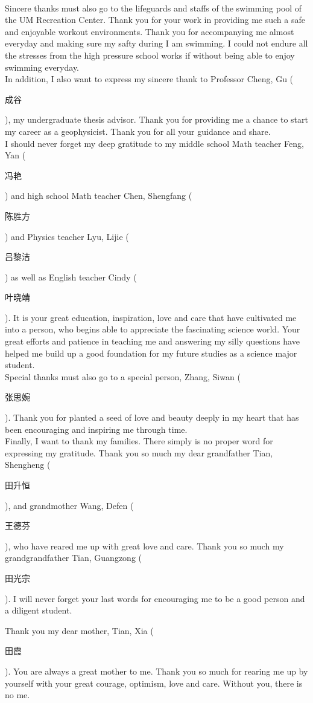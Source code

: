 \\
Sincere thanks must also go to the lifeguards and staffs of the swimming pool of the UM Recreation Center. Thank you for your work in providing me such a safe and enjoyable workout environments. Thank you for accompanying me almost everyday and making sure my safty during I am swimming. I could not endure all the stresses from the high pressure school works if without being able to enjoy swimming everyday.  
\\
In addition, I also want to express my sincere thank to Professor Cheng, Gu (\begin{CJK}{UTF8}{gbsn}成谷\end{CJK}), my undergraduate thesis advisor. Thank you for providing me a chance to start my career as a geophysicist. Thank you for all your guidance and share. 
\\
I should never forget my deep gratitude to my middle school Math teacher Feng, Yan (\begin{CJK}{UTF8}{gbsn}冯艳\end{CJK}) and high school Math teacher Chen, Shengfang (\begin{CJK}{UTF8}{gbsn}陈胜方\end{CJK}) and Physics teacher Lyu, Lijie (\begin{CJK}{UTF8}{gbsn}吕黎洁\end{CJK}) as well as English teacher Cindy (\begin{CJK}{UTF8}{gbsn}叶晓靖\end{CJK}). It is your great education, inspiration, love and care that have cultivated me into a person, who begins able to appreciate the fascinating science world. Your great efforts and patience in teaching me and answering my silly questions have helped me build up a good foundation for my future studies as a science major student.
\\
Special thanks must also go to a special person, Zhang, Siwan (\begin{CJK}{UTF8}{gbsn}张思婉\end{CJK}). Thank you for planted a seed of love and beauty deeply in my heart that has been encouraging and inspiring me through time.    
\\
Finally, I want to thank my families. There simply is no proper word for expressing my gratitude. Thank you so much my dear grandfather Tian, Shengheng (\begin{CJK}{UTF8}{gbsn}田升恒\end{CJK}), and grandmother Wang, Defen (\begin{CJK}{UTF8}{gbsn}王德芬\end{CJK}), who have reared me up with great love and care. Thank you so much my grandgrandfather Tian, Guangzong (\begin{CJK}{UTF8}{gbsn}田光宗\end{CJK}). I will never forget your last words for encouraging me to be a good person and a diligent student.

Thank you my dear mother, Tian, Xia (\begin{CJK}{UTF8}{gbsn}田霞\end{CJK}). You are always a great mother to me. Thank you so much for rearing me up by yourself with your great courage, optimism, love and care. Without you, there is no me.
